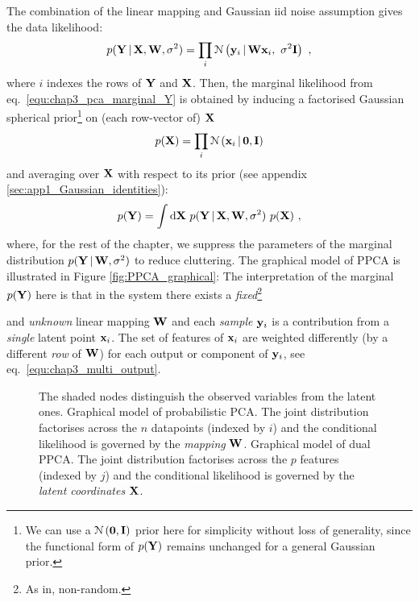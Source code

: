       The combination of the linear mapping and Gaussian iid noise assumption gives the data likelihood:
      \begin{equation}
	p(\mathbf{Y} \,|\, \mathbf{X}, \mathbf{W}, \sigma^2) = \prod_{i} \mathcal{N} \left( \mathbf{y}_i \,|\, \mathbf{W} \mathbf{x}_i , ~ \sigma^2\mathbf{I}  \right) ~,
      \end{equation}
      where $i$ indexes the rows of $\mathbf{Y}$ and $\mathbf{X}$. Then, the marginal likelihood from eq.~\eqref{equ:chap3_pca_marginal_Y} is obtained by inducing a factorised Gaussian spherical prior\footnote{ We can use a $\mathcal{N} \left( \mathbf{0}, \mathbf{I} \right)$ prior here for simplicity without loss of generality, since the functional form of $p(\mathbf{Y})$ remains unchanged for a general Gaussian prior.} on (each row-vector of) $\mathbf{X}$
      \begin{equation}
	p(\mathbf{X}) = \prod_i \mathcal{N} \left(  \mathbf{x}_i \,|\, \mathbf{0} ,  \mathbf{I}  \right)
      \end{equation}
      and averaging over $\mathbf{X}$ with respect to its prior (see appendix \ref{sec:app1_Gaussian_identities}):
      \begin{equation} \label{equ:chap3_averaging_over_X}
	p(\mathbf{Y}) = \int \textrm{d}\mathbf{X} ~ p(\mathbf{Y} \,|\, \mathbf{X}, \mathbf{W}, \sigma^2) ~ p(\mathbf{X}) ~,
      \end{equation}
      where, for the rest of the chapter, we suppress the parameters of the marginal distribution $p(\mathbf{Y} \,|\, \mathbf{W}, \sigma^2)$ to reduce cluttering. The graphical model of PPCA is illustrated in Figure \ref{fig:PPCA_graphical}: The interpretation of the marginal $p(\mathbf{Y})$ here is that in the system there exists a \emph{fixed}\footnote{As in, non-random.}\addtocounter{footnote}{-1}\addtocounter{Hfootnote}{-1} and \emph{unknown} linear mapping $\mathbf{W}$ and each \emph{sample} $\mathbf{y}_i$ is a contribution from a \emph{single} latent point $\mathbf{x}_i$. The set of features of $\mathbf{x}_i$ are weighted differently (by a different \emph{row} of $\mathbf{W}$) for each output or component of $\mathbf{y}_i$, see eq.~\eqref{equ:chap3_multi_output}.

      \begin{figure}[!htbp]
	\centering
	\caption[Graphical model of probabilistic PCA.]{
	  The shaded nodes distinguish the observed variables from the latent ones.
	  \textbf{} Graphical model of probabilistic PCA. The joint distribution factorises across the $n$ datapoints (indexed by $i$) and the conditional likelihood is governed by the \emph{mapping} $\mathbf{W}$.
	  \textbf{} Graphical model of dual PPCA. The joint distribution factorises across the $p$ features (indexed by $j$) and the conditional likelihood is governed by the \emph{latent coordinates} $\mathbf{X}$.
	}
      \end{figure}

